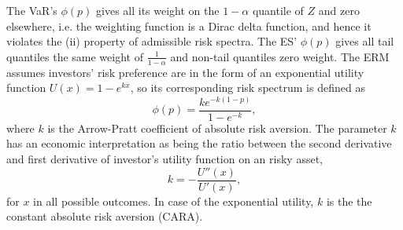The VaR's $\phi(p)$ gives all its weight on the $1-\alpha$ quantile of $Z$ and zero elsewhere,
i.e. the weighting function is a Dirac delta function, and hence it
violates the (ii) property of admissible risk spectra. 
The ES' $\phi(p)$ gives all tail quantiles the same weight of
$\displaystyle\frac{1}{1-\alpha}$ and non-tail quantiles zero weight. 
The ERM assumes investors' risk preference are in the form of an
exponential utility function $U(x)=1-e^{kx}$, so its corresponding
risk spectrum is defined as
\begin{equation*}
  \phi(p) =\frac{k e^{-k(1-p)}}{1-e^{-k}} , \label{eq:phi}
\end{equation*}
where $k$ is the Arrow-Pratt coefficient of absolute risk aversion. 
The parameter $k$ has an economic interpretation as being the ratio
between the second derivative and first derivative 
of investor's utility function on an risky asset,
\begin{equation*}
  k = -\frac{U''(x)}{U'(x)},
\end{equation*}
for $x$ in all possible outcomes.
In case of the exponential utility, $k$ is the the constant absolute risk aversion (CARA).





